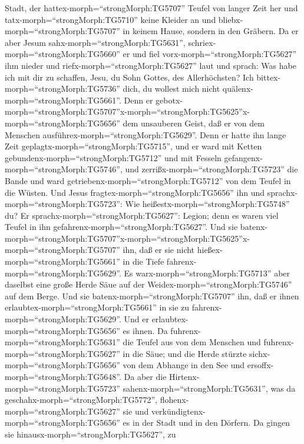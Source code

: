 Stadt, der hattex-morph=``strongMorph:TG5707'' Teufel von langer Zeit
her und tatx-morph=``strongMorph:TG5710'' keine Kleider an und
bliebx-morph=``strongMorph:TG5707'' in keinem Hause, sondern in den
Gräbern.  Da er aber Jesum
sahx-morph=``strongMorph:TG5631'', schriex-morph=``strongMorph:TG5660''
er und fiel vorx-morph=``strongMorph:TG5627'' ihm nieder und
riefx-morph=``strongMorph:TG5627'' laut und sprach: Was habe ich mit dir
zu schaffen, Jesu, du Sohn Gottes, des Allerhöchsten? Ich
bittex-morph=``strongMorph:TG5736'' dich, du wollest mich nicht
quälenx-morph=``strongMorph:TG5661''.  Denn er
gebotx-morph=``strongMorph:TG5707''\textbar x-morph=``strongMorph:TG5625''x-morph=``strongMorph:TG5656''
dem unsauberen Geist, daß er von dem Menschen
ausführex-morph=``strongMorph:TG5629''. Denn er hatte ihn lange Zeit
geplagtx-morph=``strongMorph:TG5715'', und er ward mit Ketten
gebundenx-morph=``strongMorph:TG5712'' und mit Fesseln
gefangenx-morph=``strongMorph:TG5746'', und
zerrißx-morph=``strongMorph:TG5723'' die Bande und ward
getriebenx-morph=``strongMorph:TG5712'' von dem Teufel in die Wüsten.
 Und Jesus fragtex-morph=``strongMorph:TG5656'' ihn und
sprachx-morph=``strongMorph:TG5723'': Wie
heißestx-morph=``strongMorph:TG5748'' du? Er
sprachx-morph=``strongMorph:TG5627'': Legion; denn es waren viel Teufel
in ihn gefahrenx-morph=``strongMorph:TG5627''.  Und sie
batenx-morph=``strongMorph:TG5707''\textbar x-morph=``strongMorph:TG5625''x-morph=``strongMorph:TG5707''
ihn, daß er sie nicht hießex-morph=``strongMorph:TG5661'' in die Tiefe
fahrenx-morph=``strongMorph:TG5629''.  Es
warx-morph=``strongMorph:TG5713'' aber daselbst eine große Herde Säue
auf der Weidex-morph=``strongMorph:TG5746'' auf dem Berge. Und sie
batenx-morph=``strongMorph:TG5707'' ihn, daß er ihnen
erlaubtex-morph=``strongMorph:TG5661'' in sie zu
fahrenx-morph=``strongMorph:TG5629''. Und er
erlaubtex-morph=``strongMorph:TG5656'' es ihnen.  Da
fuhrenx-morph=``strongMorph:TG5631'' die Teufel aus von dem Menschen und
fuhrenx-morph=``strongMorph:TG5627'' in die Säue; und die Herde stürzte
sichx-morph=``strongMorph:TG5656'' von dem Abhange in den See und
ersoffx-morph=``strongMorph:TG5648''.  Da aber die
Hirtenx-morph=``strongMorph:TG5723''
sahenx-morph=``strongMorph:TG5631'', was da
geschahx-morph=``strongMorph:TG5772'',
flohenx-morph=``strongMorph:TG5627'' sie und
verkündigtenx-morph=``strongMorph:TG5656'' es in der Stadt und in den
Dörfern.  Da gingen sie
hinausx-morph=``strongMorph:TG5627'', zu
